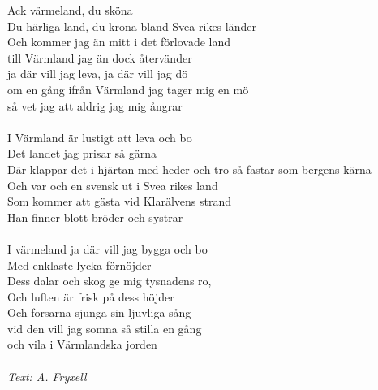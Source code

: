\vspace{10pt}
Ack värmeland, du sköna\\
Du härliga land, du krona bland Svea rikes länder\\
Och kommer jag än mitt i det förlovade land\\
till Värmland jag än dock återvänder\\
ja där vill jag leva, ja där vill jag dö\\
om en gång ifrån Värmland jag tager mig en mö\\
så vet jag att aldrig jag mig ångrar\\
\\
I Värmland är lustigt att leva och bo\\
Det landet jag prisar så gärna\\
Där klappar det i hjärtan med heder och tro så fastar som bergens kärna\\
Och var och en svensk ut i Svea rikes land\\
Som kommer att gästa vid Klarälvens strand\\
Han finner blott bröder och systrar\\
\\
I värmeland ja där vill jag bygga och bo\\
Med enklaste lycka förnöjder\\
Dess dalar och skog ge mig tysnadens ro,\\
Och luften är frisk på dess höjder\\
Och forsarna sjunga sin ljuvliga sång\\
vid den vill jag somna så stilla en gång\\
och vila i Värmlandska jorden\\
\\
{\footnotesize\textit{Text: A. Fryxell}}
